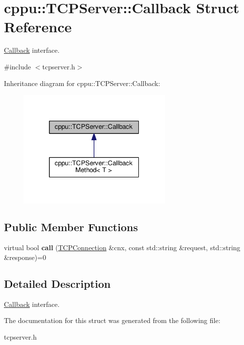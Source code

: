 \hypertarget{structcppu_1_1TCPServer_1_1Callback}{\section{cppu\+:\+:T\+C\+P\+Server\+:\+:Callback Struct Reference}
\label{structcppu_1_1TCPServer_1_1Callback}
}


\hyperlink{structcppu_1_1TCPServer_1_1Callback}{Callback} interface.  




{\ttfamily \#include $<$tcpserver.\+h$>$}



Inheritance diagram for cppu\+:\+:T\+C\+P\+Server\+:\+:Callback\+:
\nopagebreak
\begin{figure}[H]
\begin{center}
\leavevmode
\includegraphics[width=217pt]{structcppu_1_1TCPServer_1_1Callback__inherit__graph}
\end{center}
\end{figure}
\subsection*{Public Member Functions}
\begin{DoxyCompactItemize}
\item 
\hypertarget{structcppu_1_1TCPServer_1_1Callback_aabe4b0b30e14ddeb7c0c02aa3a335eba}{virtual bool {\bfseries call} (\hyperlink{classcppu_1_1TCPConnection}{T\+C\+P\+Connection} \&cnx, const std\+::string \&request, std\+::string \&response)=0}\label{structcppu_1_1TCPServer_1_1Callback_aabe4b0b30e14ddeb7c0c02aa3a335eba}

\end{DoxyCompactItemize}


\subsection{Detailed Description}
\hyperlink{structcppu_1_1TCPServer_1_1Callback}{Callback} interface. 

The documentation for this struct was generated from the following file\+:\begin{DoxyCompactItemize}
\item 
tcpserver.\+h\end{DoxyCompactItemize}
